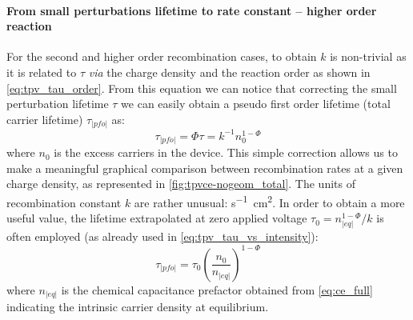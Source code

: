		\paragraph{From small perturbations lifetime to rate constant -- higher order reaction}
		For the second and higher order recombination cases, to obtain $k$ is non\hyp{}trivial as it is related to $\tau$ \textsl{via} the charge density \cite{ORegan2007} and the reaction order \cite{Shuttle2008,Du2018,Barnes2011,Barnes2011a} as shown in \cref{eq:tpv_tau_order}.
		From this equation we can notice that correcting the small perturbation lifetime $\tau$ we can easily obtain a pseudo first order lifetime (total carrier lifetime) $\tau_|pfo|$ as:
		\begin{equation}\label{eq:tau_pfo}
			\tau_|pfo| = \Phi \tau = k^{-1} n_0^{1-\Phi}
		\end{equation}
		where $n_0$ is the excess carriers in the device.
		This simple correction allows us to make a meaningful graphical comparison between recombination rates at a given charge density, as represented in \cref{fig:tpvce-nogeom_total}.
		The units of recombination constant $k$ are rather unusual: \si{\s^{-1}.\cm^{2}}.
		In order to obtain a more useful value, the lifetime extrapolated at zero applied voltage $\tau_0=n_|eq|^{1-\Phi}/k$ is often employed \cite{Kirchartz2012,Du2018,Kiermasch2019,Wheeler2017} (as already used in \cref{eq:tpv_tau_vs_intensity}):
		\begin{equation}\label{eq:tau_pfo_neq}
			\tau_|pfo| = \tau_0 \left(\frac{n_0}{n_|eq|}\right)^{1-\Phi}
		\end{equation}
		where $n_|eq|$ is the chemical capacitance prefactor obtained from \cref{eq:ce_full} indicating the intrinsic carrier density at equilibrium.


		\FloatBarrier
		\newpage
